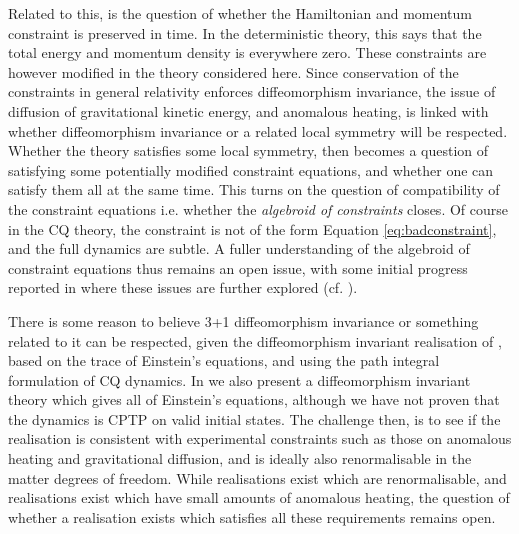 \documentclass[aps,pra,showpacs,citeautoscript,amsmath,amssymb,floatfix,superscriptaddress,bbm, verbatim,amsfonts,changes,10pt,nofootinbib,longbibliography]{revtex4-1}
\begin{document}
Related to this, is the question of whether 
  the Hamiltonian and momentum constraint is preserved in time. In the deterministic theory, this says that the total energy and momentum density is everywhere zero. These constraints are however modified in the theory considered here. Since conservation of the constraints in general relativity enforces diffeomorphism invariance, the issue of diffusion of gravitational kinetic energy, and anomalous heating, is linked with whether diffeomorphism invariance or a related local symmetry will be respected.  Whether the theory satisfies some local symmetry, then becomes a question of satisfying some potentially modified constraint equations, and whether one can satisfy them all at the same time. %
  This turns on the question of compatibility of the constraint equations i.e. whether the {\it algebroid of constraints}\cite{algebroid_foot} closes. %
  Of course in the CQ theory, the constraint is not of the form Equation \eqref{eq:badconstraint}, and the full dynamics are subtle. A fuller understanding of the algebroid of constraint equations thus remains an open issue, with some initial progress reported in \cite{UCL2022constraints} where these issues are further explored (cf. \cite{oppenheim2023covariant}).
  
There is some reason to believe 3+1 diffeomorphism invariance or something related to it can be respected, given the diffeomorphism invariant realisation of \cite{oppenheim2023covariant}, based on the trace of Einstein's equations, and using the path integral formulation of CQ dynamics\cite{oppenheim2023path}. In  \cite{oppenheim2023covariant} we also present a diffeomorphism invariant theory which gives all of Einstein's equations, although we have not proven that the dynamics is CPTP on valid initial states. The  challenge then, is to see if the realisation is consistent with experimental constraints such as those on anomalous heating and gravitational diffusion, and is ideally also renormalisable in the matter degrees of freedom. While realisations exist which are renormalisable, and realisations exist which have small amounts of anomalous heating, the question of whether a realisation exists which satisfies all these requirements remains open.\label{par:challenge}
\end{document}
